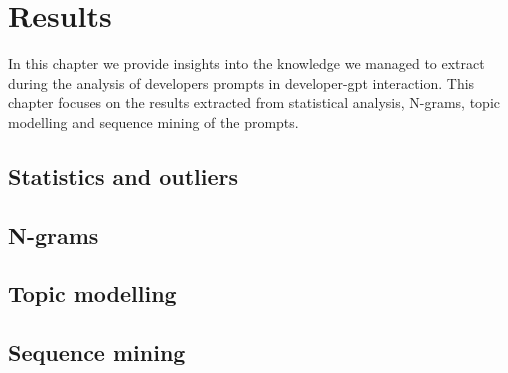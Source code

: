 \chapter{Results} \label{results}
In this chapter we provide insights into the knowledge we managed to extract during the analysis of developers prompts in developer-\gls{gpt} interaction. This chapter focuses on the results extracted from statistical analysis, N-grams, topic modelling and sequence mining of the prompts. 

\section{Statistics and outliers}

\section{N-grams}

\section{Topic modelling}

\section{Sequence mining}